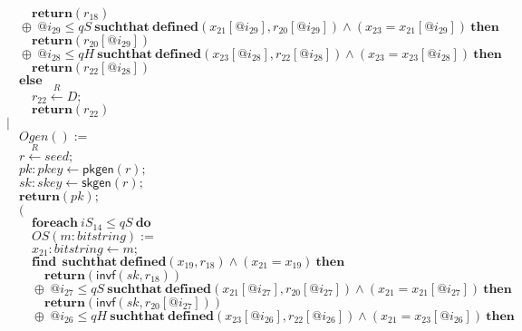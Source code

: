 \documentclass{article}
\newcommand{\store}{\leftarrow}
\newcommand{\getR}{\stackrel{R}{\store}}
\newcommand{\kw}[1]{\mathbf{#1}}
\newcommand{\kwf}[1]{\mathsf{#1}}
\newcommand{\var}[1]{\mathit{#1}}
\newcommand{\kwt}[1]{\mathit{#1}}
\newcommand{\kwp}[1]{\mathit{#1}}
\begin{document}
\begin{tabbing}
$\quad \quad \kw{return}\kwf{}(\var{r}_{18})$\\
$\quad \oplus\ \var{@i}_{29} \leq \kwp{qS}\ \kw{suchthat}\ \kw{defined}(\var{x}_{21}[\var{@i}_{29}], \var{r}_{20}[\var{@i}_{29}])\wedge (\var{x}_{23}  =  \var{x}_{21}[\var{@i}_{29}])\ \kw{then}$\\
$\quad \quad \kw{return}\kwf{}(\var{r}_{20}[\var{@i}_{29}])$\\
$\quad \oplus\ \var{@i}_{28} \leq \kwp{qH}\ \kw{suchthat}\ \kw{defined}(\var{x}_{23}[\var{@i}_{28}], \var{r}_{22}[\var{@i}_{28}])\wedge (\var{x}_{23}  =  \var{x}_{23}[\var{@i}_{28}])\ \kw{then}$\\
$\quad \quad \kw{return}\kwf{}(\var{r}_{22}[\var{@i}_{28}])$\\
$\quad \kw{else}$\\
$\quad \quad \var{r}_{22} \getR \kwt{D};$\\
$\quad \quad \kw{return}\kwf{}(\var{r}_{22})$\\
$|$\\
$\quad Ogen() :=$\\
$\quad \var{r} \getR \kwt{seed};$\\
$\quad \var{pk}: \kwt{pkey} \store \kwf{pkgen}(\var{r});$\\
$\quad \var{sk}: \kwt{skey} \store \kwf{skgen}(\var{r});$\\
$\quad \kw{return}\kwf{}(\var{pk});$\\
$\quad ($\\
$\quad \quad \kw{foreach}\ \var{iS}_{14} \leq \kwp{qS}\ \kw{do}$\\
$\quad \quad OS(\var{m}: \kwt{bitstring}) :=$\\
$\quad \quad \var{x}_{21}: \kwt{bitstring} \store \var{m};$\\
$\quad \quad \kw{find}\ \ \kw{suchthat}\ \kw{defined}(\var{x}_{19}, \var{r}_{18})\wedge (\var{x}_{21}  =  \var{x}_{19})\ \kw{then}$\\
$\quad \quad \quad \kw{return}\kwf{}(\kwf{invf}(\var{sk}, \var{r}_{18}))$\\
$\quad \quad \oplus\ \var{@i}_{27} \leq \kwp{qS}\ \kw{suchthat}\ \kw{defined}(\var{x}_{21}[\var{@i}_{27}], \var{r}_{20}[\var{@i}_{27}])\wedge (\var{x}_{21}  =  \var{x}_{21}[\var{@i}_{27}])\ \kw{then}$\\
$\quad \quad \quad \kw{return}\kwf{}(\kwf{invf}(\var{sk}, \var{r}_{20}[\var{@i}_{27}]))$\\
$\quad \quad \oplus\ \var{@i}_{26} \leq \kwp{qH}\ \kw{suchthat}\ \kw{defined}(\var{x}_{23}[\var{@i}_{26}], \var{r}_{22}[\var{@i}_{26}])\wedge (\var{x}_{21}  =  \var{x}_{23}[\var{@i}_{26}])\ \kw{then}$\\

\end{tabbing}
\end{document}
